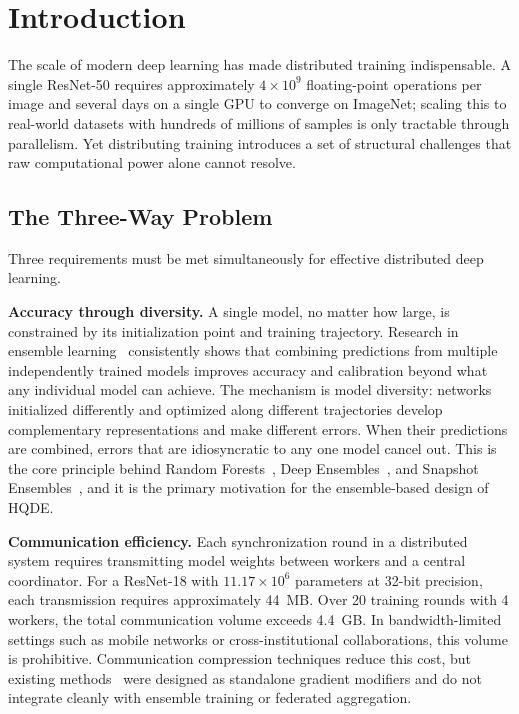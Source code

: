 \documentclass[journal,twoside]{IEEEtran}
\newcommand{\hqde}{\mbox{HQDE}\xspace}
\begin{document}
\section{Introduction}
\label{sec:intro}

The scale of modern deep learning has made distributed training
indispensable. A single ResNet-50 requires approximately $4\times10^9$
floating-point operations per image and several days on a single GPU
to converge on ImageNet; scaling this to real-world datasets with
hundreds of millions of samples is only tractable through parallelism.
Yet distributing training introduces a set of structural challenges
that raw computational power alone cannot resolve.

\subsection{The Three-Way Problem}

Three requirements must be met simultaneously for effective distributed
deep learning.

\textbf{Accuracy through diversity.} A single model, no matter how
large, is constrained by its initialization point and training
trajectory. Research in ensemble learning~\cite{lakshminarayanan2017}
consistently shows that combining predictions from multiple
independently trained models improves accuracy and calibration beyond
what any individual model can achieve. The mechanism is model diversity:
networks initialized differently and optimized along different
trajectories develop complementary representations and make different
errors. When their predictions are combined, errors that are
idiosyncratic to any one model cancel out. This is the core principle
behind Random Forests~\cite{breiman2001}, Deep
Ensembles~\cite{lakshminarayanan2017}, and Snapshot
Ensembles~\cite{huang2017snapshot}, and it is the primary motivation
for the ensemble-based design of \hqde{}.

\textbf{Communication efficiency.} Each synchronization round in a
distributed system requires transmitting model weights between workers
and a central coordinator. For a ResNet-18 with $11.17\times10^6$
parameters at 32-bit precision, each transmission requires approximately
44~MB. Over 20 training rounds with 4 workers, the total communication
volume exceeds 4.4~GB. In bandwidth-limited settings such as mobile
networks or cross-institutional collaborations, this volume is
prohibitive. Communication compression techniques reduce this cost, but
existing methods~\cite{alistarh2017,bernstein2018} were designed as
standalone gradient modifiers and do not integrate cleanly with ensemble
training or federated aggregation.
\end{document}
